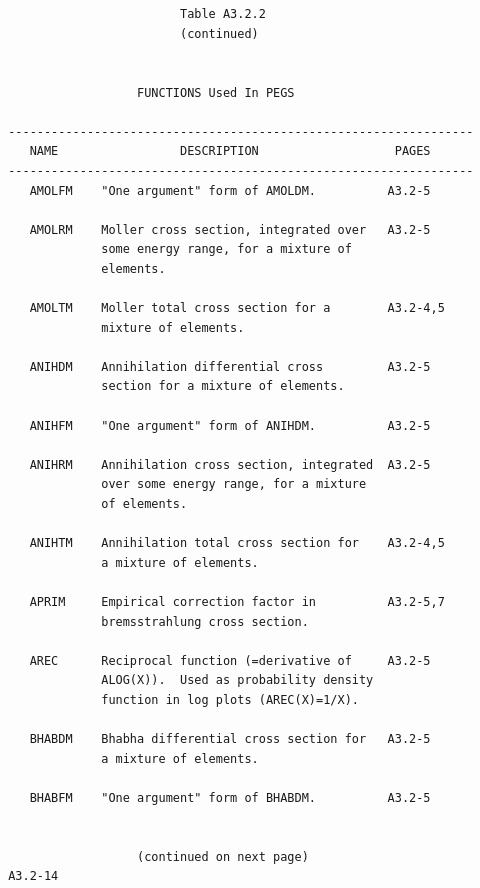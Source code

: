 \newpage {} \begin{verbatim}


                         Table A3.2.2
                         (continued)


                   FUNCTIONS Used In PEGS

 -----------------------------------------------------------------
    NAME                 DESCRIPTION                   PAGES
 -----------------------------------------------------------------
    AMOLFM    "One argument" form of AMOLDM.          A3.2-5

    AMOLRM    Moller cross section, integrated over   A3.2-5
              some energy range, for a mixture of
              elements.

    AMOLTM    Moller total cross section for a        A3.2-4,5
              mixture of elements.

    ANIHDM    Annihilation differential cross         A3.2-5
              section for a mixture of elements.

    ANIHFM    "One argument" form of ANIHDM.          A3.2-5

    ANIHRM    Annihilation cross section, integrated  A3.2-5
              over some energy range, for a mixture
              of elements.

    ANIHTM    Annihilation total cross section for    A3.2-4,5
              a mixture of elements.

    APRIM     Empirical correction factor in          A3.2-5,7
              bremsstrahlung cross section.

    AREC      Reciprocal function (=derivative of     A3.2-5
              ALOG(X)).  Used as probability density
              function in log plots (AREC(X)=1/X).

    BHABDM    Bhabha differential cross section for   A3.2-5
              a mixture of elements.

    BHABFM    "One argument" form of BHABDM.          A3.2-5


                   (continued on next page)
 A3.2-14
\end{verbatim}

